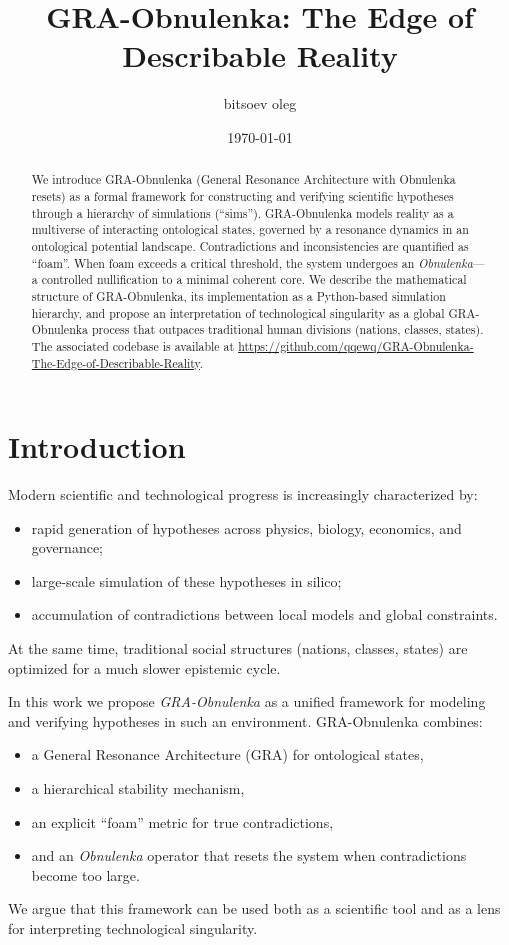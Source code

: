 \documentclass[11pt,a4paper]{article}
\title{GRA-Obnulenka: The Edge of Describable Reality}
\author{bitsoev oleg}
\date{\today}
\begin{document}
\maketitle

\begin{abstract}
We introduce GRA-Obnulenka (General Resonance Architecture with Obnulenka resets)
as a formal framework for constructing and verifying scientific hypotheses
through a hierarchy of simulations (``sims'').
GRA-Obnulenka models reality as a multiverse of interacting ontological states,
governed by a resonance dynamics in an ontological potential landscape.
Contradictions and inconsistencies are quantified as ``foam''.
When foam exceeds a critical threshold, the system undergoes an
\emph{Obnulenka}---a controlled nullification to a minimal coherent core.
We describe the mathematical structure of GRA-Obnulenka,
its implementation as a Python-based simulation hierarchy,
and propose an interpretation of technological singularity
as a global GRA-Obnulenka process that outpaces
traditional human divisions (nations, classes, states).
The associated codebase is available at
\url{https://github.com/qqewq/GRA-Obnulenka-The-Edge-of-Describable-Reality}.
\end{abstract}

\tableofcontents
\newpage

\section{Introduction}
Modern scientific and technological progress is increasingly characterized
by:
\begin{itemize}
  \item rapid generation of hypotheses across physics, biology, economics,
        and governance;
  \item large-scale simulation of these hypotheses in silico;
  \item accumulation of contradictions between local models and global constraints.
\end{itemize}
At the same time, traditional social structures (nations, classes, states)
are optimized for a much slower epistemic cycle.

In this work we propose \emph{GRA-Obnulenka} as a unified framework
for modeling and verifying hypotheses in such an environment.
GRA-Obnulenka combines:
\begin{itemize}
  \item a General Resonance Architecture (GRA) for ontological states,
  \item a hierarchical stability mechanism,
  \item an explicit ``foam'' metric for true contradictions,
  \item and an \emph{Obnulenka} operator that resets the system
        when contradictions become too large.
\end{itemize}
We argue that this framework can be used both as a scientific tool
and as a lens for interpreting technological singularity.
\end{document}
